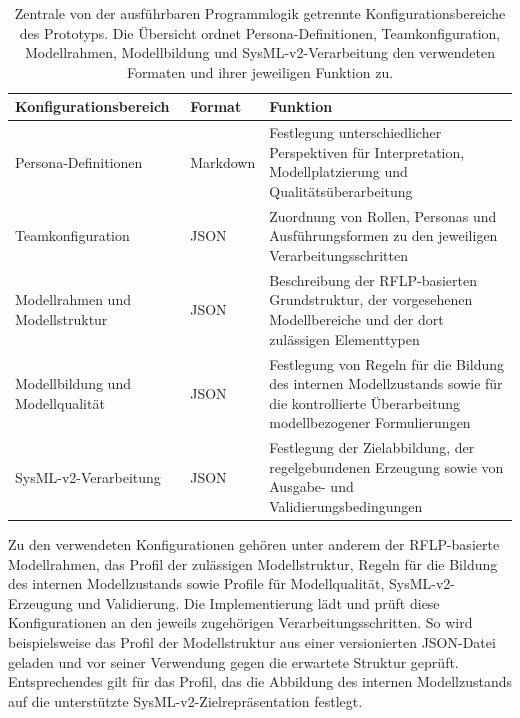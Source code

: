\begin{table}[htbp]
    \centering
    \caption[Zentrale Konfigurationsbereiche des Prototyps]{
        Zentrale von der ausführbaren Programmlogik getrennte
        Konfigurationsbereiche des Prototyps. Die Übersicht ordnet
        Persona-Definitionen, Teamkonfiguration, Modellrahmen, Modellbildung und
        SysML-v2-Verarbeitung den verwendeten Formaten und ihrer jeweiligen
        Funktion zu.}
    \label{tab:implementation_configuration}
    \small
    \begin{tabular}{
        p{}
        p{}
        p{}
    }
        \hline
        \textbf{Konfigurationsbereich} &
        \textbf{Format} &
        \textbf{Funktion} \\
        \hline

        Persona-Definitionen &
        Markdown &
        Festlegung unterschiedlicher Perspektiven für Interpretation,
        Modellplatzierung und Qualitätsüberarbeitung \\

        Teamkonfiguration &
        JSON &
        Zuordnung von Rollen, Personas und Ausführungsformen zu den
        jeweiligen Verarbeitungsschritten \\

        Modellrahmen und Modellstruktur &
        JSON &
        Beschreibung der RFLP-basierten Grundstruktur, der vorgesehenen
        Modellbereiche und der dort zulässigen Elementtypen \\

        Modellbildung und Modellqualität &
        JSON &
        Festlegung von Regeln für die Bildung des internen Modellzustands
        sowie für die kontrollierte Überarbeitung modellbezogener
        Formulierungen \\

        SysML-v2-Verarbeitung &
        JSON &
        Festlegung der Zielabbildung, der regelgebundenen Erzeugung sowie
        von Ausgabe- und Validierungsbedingungen \\
        \hline
    \end{tabular}
\end{table}
\newpage
Zu den verwendeten Konfigurationen gehören unter anderem der RFLP-basierte
Modellrahmen, das Profil der zulässigen Modellstruktur, Regeln für die
Bildung des internen Modellzustands sowie Profile für Modellqualität,
SysML-v2-Erzeugung und Validierung. Die Implementierung lädt und prüft diese
Konfigurationen an den jeweils zugehörigen Verarbeitungsschritten. So wird
beispielsweise das Profil der Modellstruktur aus einer versionierten
JSON-Datei geladen und vor seiner Verwendung gegen die erwartete Struktur
geprüft. Entsprechendes gilt für das Profil, das die Abbildung des internen
Modellzustands auf die unterstützte SysML-v2-Zielrepräsentation festlegt.

